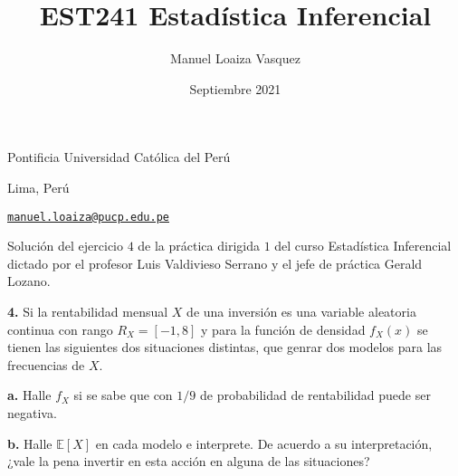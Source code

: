 \documentclass{article}
\title{EST241 Estad\'istica Inferencial}
\author{Manuel Loaiza Vasquez}
\date{Septiembre 2021}
\newenvironment{statement}[1]{\smallskip\noindent\color[rgb]{1.00,0.00,0.50} {\bf #1.}}{}
\theoremstyle{definition}
\theoremstyle{remark}
\begin{document}
\maketitle

\vspace*{-0.25in}
\centerline{Pontificia Universidad Cat\'olica del Per\'u}
\centerline{Lima, Per\'u}
\centerline{\href{mailto:manuel.loaiza@pucp.edu.pe}{{\tt manuel.loaiza@pucp.edu.pe}}}
\vspace*{0.15in}

\begin{framed}
  Soluci\'on del ejercicio $4$ de la pr\'actica dirigida $1$ del curso
  Estad\'istica Inferencial dictado por el profesor Luis Valdivieso Serrano
  y el jefe de pr\'actica Gerald Lozano.
\end{framed}

\begin{statement}{4}
  Si la rentabilidad mensual $X$ de una inversi\'on es una variable aleatoria
  continua con rango $R_X = [-1, 8]$ y para la funci\'on de densidad
  $f_X(x)$ se tienen las siguientes dos situaciones distintas, que genrar dos
  modelos para las frecuencias de $X$.
\end{statement}

\begin{statement}{a}
  Halle $f_X$ si se sabe que con $1 / 9$ de probabilidad de rentabilidad puede
  ser negativa.
\end{statement}

\begin{statement}{b}
  Halle $\mathbb{E}[X]$ en cada modelo e interprete. De acuerdo a su interpretaci\'on,
  ¿vale la pena invertir en esta acci\'on en alguna de las situaciones?
\end{statement}
\end{document}
